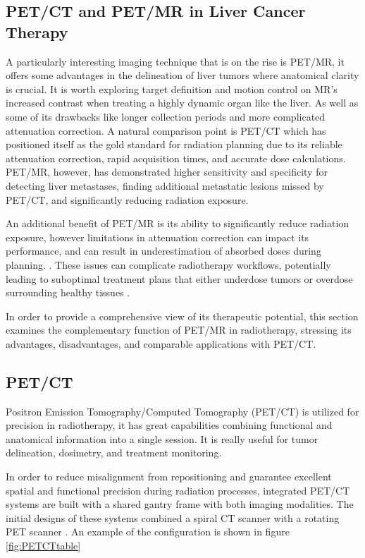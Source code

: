 \documentclass[11pt]{article} %
\begin{document}
\begin{multicols}{2}
\section{PET/CT and PET/MR in Liver Cancer Therapy}

A particularly interesting imaging technique that is on the rise is PET/MR, it offers some advantages in the delineation of liver tumors where anatomical clarity is crucial. It is worth exploring target definition and motion control on MR's increased contrast when treating a highly dynamic organ like the liver. As well as some of its drawbacks like longer collection periods and more complicated attenuation correction. A natural comparison point is PET/CT which has positioned itself as the gold standard for radiation planning due to its reliable attenuation correction, rapid acquisition times, and accurate dose calculations. PET/MR, however, has demonstrated higher sensitivity and specificity for detecting liver metastases, finding additional metastatic lesions missed by PET/CT, and significantly reducing radiation exposure. \cite{frontiers2021, springer2014}

An additional benefit of PET/MR is its ability to significantly reduce radiation exposure, however limitations in attenuation correction can impact its performance, and can result in underestimation of absorbed doses during planning. \cite{ajr2012, pmc2017}.
These issues can complicate radiotherapy workflows, potentially leading to suboptimal treatment plans that either underdose tumors or overdose surrounding healthy tissues \cite{pmc2023}.

In order to provide a comprehensive view of its therapeutic potential, this section examines the complementary function of PET/MR in radiotherapy, stressing its advantages, disadvantages, and comparable applications with PET/CT.

\subsection{PET/CT}
Positron Emission Tomography/Computed Tomography (PET/CT) is utilized for precision in radiotherapy, it has great capabilities combining functional and anatomical information into a single session. It is really useful for tumor delineation, dosimetry, and treatment monitoring.

In order to reduce misalignment from repositioning and guarantee excellent spatial and functional precision during radiation processes, integrated PET/CT systems are built with a shared gantry frame with both imaging modalities. The initial designs of these systems combined a spiral CT scanner with a rotating PET scanner \cite{beyer2000, bennett2009}. An example of the configuration is shown in figure \ref{fig:PETCTtable}


\end{multicols}
\end{document}
